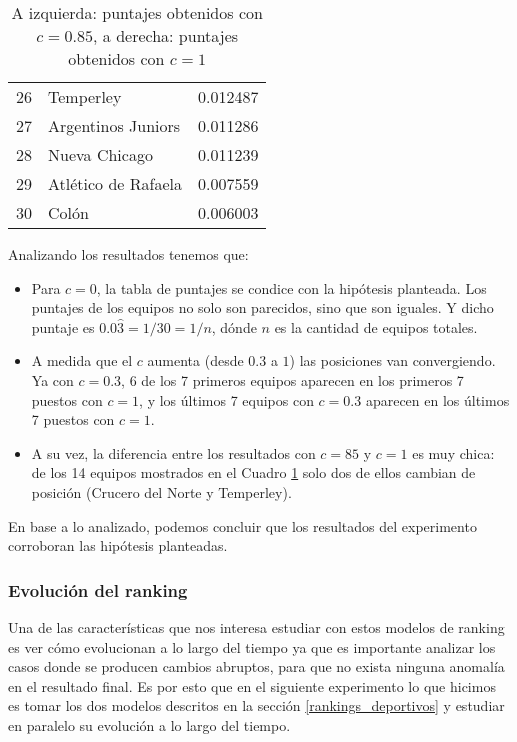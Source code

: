 \begin{table}[H]
\begin{center}
\begin{tabular}{| c | l | c |}
            26 & Temperley & 0.012487 \\
            27 & Argentinos Juniors & 0.011286 \\
            28 & Nueva Chicago & 0.011239 \\
            29 & Atlético de Rafaela & 0.007559 \\
            30 & Colón & 0.006003 \\
            \hline
        \end{tabular}
        \captionsetup{justification=centering}
        \caption{A izquierda: puntajes obtenidos con $c=0.85$, a derecha: puntajes obtenidos con $c=1$}
        \label{exp_resultados_variar_c_2}
    \end{center}
\end{table}

Analizando los resultados tenemos que:

\begin{itemize}
    \item Para $c=0$, la tabla de puntajes se condice con la hipótesis planteada.
        Los puntajes de los equipos no solo son parecidos, sino que son iguales.
        Y dicho puntaje es $0.0\hat{3} = 1/30 = 1/n$, dónde $n$ es la cantidad de
        equipos totales.
    \item A medida que el $c$ aumenta (desde $0.3$ a $1$) las posiciones van convergiendo.
        Ya con $c=0.3$, 6 de los 7 primeros equipos aparecen en los primeros 7 puestos con $c=1$,
        y los últimos 7 equipos con $c=0.3$ aparecen en los últimos 7 puestos con $c=1$.
    \item A su vez, la diferencia entre los resultados con $c=85$ y $c=1$ es muy chica:
        de los 14 equipos mostrados en el Cuadro \ref{exp_resultados_variar_c_2} solo dos
        de ellos cambian de posición (Crucero del Norte y Temperley).
\end{itemize}

En base a lo analizado, podemos concluir que los resultados del experimento corroboran
las hipótesis planteadas.

\subsubsection{Evolución del ranking}

Una de las características que nos interesa estudiar con estos modelos de
ranking es ver cómo evolucionan a lo largo del tiempo ya que es importante
analizar los casos donde se producen cambios abruptos, para que no exista
ninguna anomalía en el resultado final. Es por esto que en el siguiente
experimento lo que hicimos es tomar los dos modelos descritos en la sección \ref{rankings_deportivos}
 y estudiar en paralelo su evolución a lo largo del tiempo.


